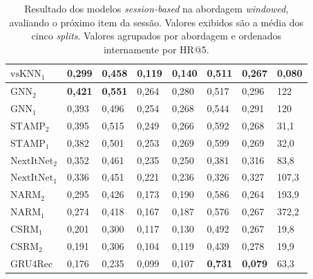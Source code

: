 \begin{table}[htbp]
\begin{tabular}{|l|l|l|l|l|l|l|l|}
    \hline
    $\text{vsKNN}_{1}$ & 0,299 & 0,458 & 0,119 & 0,140 & 0,511 & 0,267 & 0,080 \\
    \hline
    \hline
    $\text{GNN}_2$ & \textbf{0,421} & \textbf{0,551} & 0,264 & 0,280 & 0,517 & 0,296 & 122 \\
    \hline
    $\text{GNN}_1$ & 0,393 & 0,496 & 0,254 & 0,268 & 0,544 & 0,291 & 120 \\
    \hline
    $\text{STAMP}_2$ & 0,395 & 0,515 & 0,249 & 0,266 & 0,592 & 0,268 & 31,1 \\
    \hline
    $\text{STAMP}_1$ & 0,382 & 0,501 & 0,253 & 0,269 & 0,599 & 0,269 & 32,0 \\
    \hline
    $\text{NextItNet}_2$ & 0,352 & 0,461 & 0,235 & 0,250 & 0,381 & 0,316 & 83,8 \\  
    \hline
    $\text{NextItNet}_1$ & 0,336 & 0,451 & 0,221 & 0,236 & 0,326 & 0,327 & 107,3 \\
    \hline
    $\text{NARM}_2$ & 0,295 & 0,426 & 0,173 & 0,190 & 0,586 & 0,264 & 193,9 \\
    \hline
    $\text{NARM}_1$ & 0,274 & 0,418 & 0,167 & 0,187 & 0,576 & 0,267 & 372,2 \\
    \hline
    $\text{CSRM}_1$ & 0,201 & 0,300 & 0,117 & 0,130 & 0,492 & 0,267 & 19,8 \\
    \hline
    $\text{CSRM}_2$ & 0,191 & 0,306 & 0,104 & 0,119 & 0,439 & 0,278 & 19,9 \\
    \hline
    GRU4Rec & 0,176 & 0,235 & 0,099 & 0,107 & \textbf{0,731} & \textbf{0,079} & 63,3 \\
    \hline
    \end{tabular}
  \caption{Resultado dos modelos \textit{session-based} na abordagem
  \textit{windowed}, avaliando o próximo item da sessão. Valores exibidos são a
  média dos cinco \textit{splits}. Valores agrupados por abordagem e ordenados internamente por HR@5.}
\label{tab:windowed_next_item_all}
\end{table}


